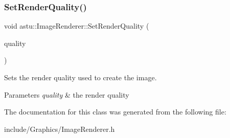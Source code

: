 \subsubsection{\texorpdfstring{Set\+Render\+Quality()}{SetRenderQuality()}}
{\footnotesize\ttfamily void astu\+::\+Image\+Renderer\+::\+Set\+Render\+Quality (\begin{DoxyParamCaption}\item[{\hyperlink{group__gfx__group_gac3b4955f341cea44f53f8446d734cd54}{Render\+Quality}}]{quality }\end{DoxyParamCaption})}

Sets the render quality used to create the image.


\begin{DoxyParams}{Parameters}
{\em quality} & the render quality \\
\hline
\end{DoxyParams}


The documentation for this class was generated from the following file\+:\begin{DoxyCompactItemize}
\item 
include/\+Graphics/Image\+Renderer.\+h\end{DoxyCompactItemize}
